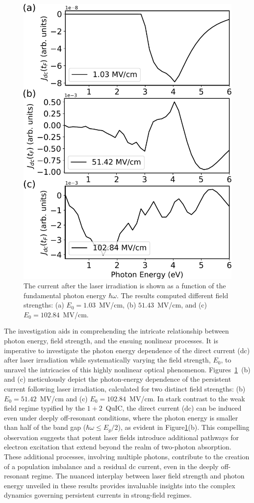 \begin{figure}[htb]
\centering
\includegraphics[width=0.8\linewidth]{pic/frequency.pdf}
\caption{\label{fig:fig4} 
The current after the laser irradiation is shown as a function of the fundamental photon energy $\hbar \omega$. The results computed different field strengths: (a) $E_0=1.03$~MV/cm, (b) $51.43$~MV/cm, and (c) $E_0=102.84$~MV/cm.}
\end{figure}

 The investigation aids in comprehending the intricate relationship between photon energy, field strength, and the ensuing nonlinear processes. It is imperative to investigate the photon energy dependence of the direct current (dc) after laser irradiation while systematically varying the field strength, $E_0$, to unravel the intricacies of this highly nonlinear optical phenomenon. 
 Figures~\ref{fig:fig4}~(b) and (c) meticulously depict the photon-energy dependence of the persistent current following laser irradiation, calculated for two distinct field strengths: (b) $E_0=51.42$~MV/cm and (c) $E_0=102.84$~MV/cm. In stark contrast to the weak field regime typified by the $1+2$~\gls{QuIC}, the direct current (dc) can be induced even under deeply off-resonant conditions, where the photon energy is smaller than half of the band gap ($\hbar \omega \le E_g/2$), as evident in Figure\ref{fig:fig4}(b). This compelling observation suggests that potent laser fields introduce additional pathways for electron excitation that extend beyond the realm of two-photon absorption. These additional processes, involving multiple photons, contribute to the creation of a population imbalance and a residual dc current, even in the deeply off-resonant regime. The nuanced interplay between laser field strength and photon energy unveiled in these results provides invaluable insights into the complex dynamics governing persistent currents in strong-field regimes.

